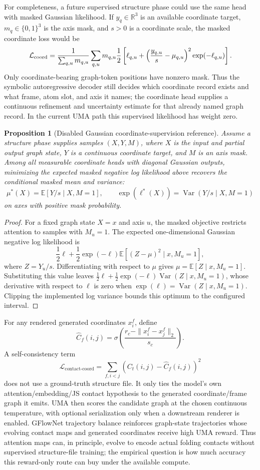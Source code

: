 \documentclass[11pt]{article}
\newtheorem{proposition}[definition]{Proposition}
\newcommand{\1}{\mathbf{1}}
\begin{document}
For completeness, a future supervised structure phase could use the same head with masked Gaussian likelihood. If \(y_q\in\mathbb R^3\) is an available coordinate target, \(m_q\in\{0,1\}^3\) is the axis mask, and \(s>0\) is a coordinate scale, the masked coordinate loss would be
\[
  \mathcal L_{\rm coord}
  =
  \frac{1}{\sum_{q,u}m_{q,u}}
  \sum_{q,u}
  m_{q,u}
  \frac12
  \left[
    \ell_{q,u}
    +
    \left(\frac{y_{q,u}}{s}-\mu_{q,u}\right)^2\exp(-\ell_{q,u})
  \right].
\]
Only coordinate-bearing graph-token positions have nonzero mask. Thus the symbolic autoregressive decoder still decides which coordinate record exists and what frame, atom slot, and axis it names; the coordinate head supplies a continuous refinement and uncertainty estimate for that already named graph record. In the current UMA path this supervised likelihood has weight zero.

\begin{proposition}[Disabled Gaussian coordinate-supervision reference]
Assume a structure phase supplies samples \((X,Y,M)\), where \(X\) is the input and partial output graph state, \(Y\) is a continuous coordinate target, and \(M\) is an axis mask. Among all measurable coordinate heads with diagonal Gaussian outputs, minimizing the expected masked negative log likelihood above recovers the conditional masked mean and variance:
\[
  \mu^*(X)=\mathbb E[Y/s\mid X,M=1],
  \qquad
  \exp(\ell^*(X))=\operatorname{Var}(Y/s\mid X,M=1)
\]
on axes with positive mask probability.
\end{proposition}
\begin{proof}
For a fixed graph state \(X=x\) and axis \(u\), the masked objective restricts attention to samples with \(M_u=1\). The expected one-dimensional Gaussian negative log likelihood is
\[
  \frac12 \ell + \frac12 \exp(-\ell)\mathbb E[(Z-\mu)^2\mid x,M_u=1],
\]
where \(Z=Y_u/s\). Differentiating with respect to \(\mu\) gives \(\mu=\mathbb E[Z\mid x,M_u=1]\). Substituting this value leaves \(\frac12\ell+\frac12\exp(-\ell)\operatorname{Var}(Z\mid x,M_u=1)\), whose derivative with respect to \(\ell\) is zero when \(\exp(\ell)=\operatorname{Var}(Z\mid x,M_u=1)\). Clipping the implemented log variance bounds this optimum to the configured interval.
\end{proof}

For any rendered generated coordinates \(x_i^f\), define
\[
  \widehat C_f(i,j)=\sigma\left(\frac{r_c-\|x_i^f-x_j^f\|_2}{s_c}\right).
\]
A self-consistency term
\[
  \mathcal L_{\mathrm{contact\mbox{-}coord}}=
  \sum_{f,i<j}\left(C_t(i,j)-\widehat C_f(i,j)\right)^2
\]
does not use a ground-truth structure file. It only ties the model's own attention/embedding/JS contact hypothesis to the generated coordinate/frame graph it emits. UMA then scores the candidate graph at the chosen continuous temperature, with optional serialization only when a downstream renderer is enabled. GFlowNet trajectory balance reinforces graph-state trajectories whose evolving contact maps and generated coordinates receive high UMA reward. Thus attention maps can, in principle, evolve to encode actual folding contacts without supervised structure-file training; the empirical question is how much accuracy this reward-only route can buy under the available compute.
\end{document}
